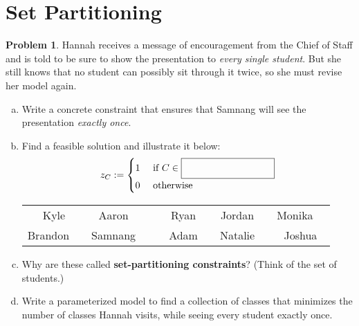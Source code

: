 \documentclass[11pt]{article}
\theoremstyle{definition}
\newtheorem{problem}{Problem}
\newcommand{\answerbox}[3]{%
  \fbox{%
    \begin{minipage}[#1]{#2}
      \hfill\vspace{#3}
    \end{minipage}
  }
}
\newcommand{\wordbox}{\answerbox{c}{1.2in}{.5cm}}
\begin{document}
\section{Set Partitioning}
\begin{problem}
Hannah receives a message of encouragement from the Chief of Staff and is told to be sure to show the presentation to \emph{every single student}.  But she still knows that no student can possibly sit through it twice, so she must revise her model again.  
\begin{enumerate}[a.]
\item Write a concrete constraint that ensures that Samnang will see the presentation \emph{exactly once}.

\vfill
\item Find a feasible solution and illustrate it below:
\[
z_{C} :=
\begin{cases}
1 & \text{ if } C \in \wordbox \\
0 & \text{ otherwise } 
\end{cases}
\]

\begin{tcolorbox}
\begin{center}
\def\arraystretch{1.5}
\setlength{\tabcolsep}{12pt}
\begin{tabular}{ccccc}
Kyle & Aaron~~ & Ryan & Jordan~~ & Monika~~ \\ Brandon~~ & Samnang~~ & ~~Adam~~ & Natalie~~ & Joshua 
\end{tabular}
\end{center}
\end{tcolorbox}
\bigskip

\item Why are these called {\bf set-partitioning constraints}?  (Think of the set of students.)
\vfill
\item  Write a parameterized model to find a collection of classes that minimizes the number of classes Hannah visits, while seeing every student exactly once. 
\vfill
\vfill
\end{enumerate}
\end{problem}
\end{document}
